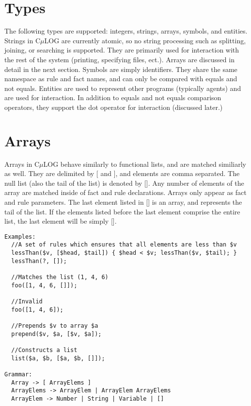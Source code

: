 \documentclass[onecolumn,titlepage]{article}
\begin{document}
\section{Types}
The following types are supported: integers, strings, arrays, symbols, and entities.
Strings in C$\mu$LOG are currently atomic, so no string processing such as splitting,
joining, or searching is supported.  They are primarily used for interaction with the
rest of the system (printing, specifying files, ect.).  Arrays are discussed in detail
in the next section.  Symbols are simply identifiers.  They share the same namespace as rule
and fact names, and can only be compared with equals and not equals.  Entities are used
to represent other programs (typically agents) and are used for interaction.  In addition
to equals and not equals comparison operators, they support the dot operator for interaction
(discussed later.)

\section{Arrays}
Arrays in C$\mu$LOG behave similarly to functional lists, and are matched similiarly as well.
They are delimited by [ and ], and elements are comma separated.  The null list (also the tail
of the list) is denoted by [].  Any number of elements of the array are matched inside of
fact and rule declarations.  Arrays only appear as fact and rule parameters.
The last element listed in [] is an array, and represents the tail of the list.  If the
elements listed before the last element comprise the entire list, the last element will be
simply [].

\begin{verbatim}
Examples:
  //A set of rules which ensures that all elements are less than $v
  lessThan($v, [$head, $tail]) { $head < $v; lessThan($v, $tail); }
  lessThan(?, []);

  //Matches the list (1, 4, 6)
  foo([1, 4, 6, []]);

  //Invalid
  foo([1, 4, 6]);

  //Prepends $v to array $a
  prepend($v, $a, [$v, $a]);

  //Constructs a list
  list($a, $b, [$a, $b, []]);

Grammar:
  Array -> [ ArrayElems ]
  ArrayElems -> ArrayElem | ArrayElem ArrayElems
  ArrayElem -> Number | String | Variable | []
\end{verbatim}
\end{document}
